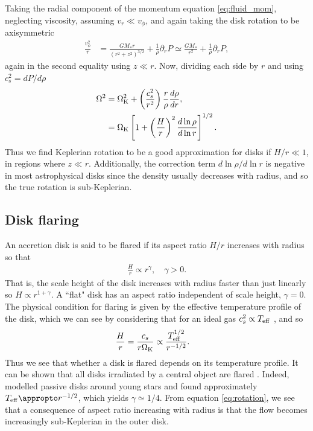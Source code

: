 Taking the radial component of the momentum equation \ref{eq:fluid_mom}, neglecting viscosity, assuming $v_r \ll v_\phi$, and again taking the disk rotation to be axisymmetric
\begin{align}
    \frac{v_\phi^2}{r} &= \frac{G M_* r}{\left( r^2 + z^2  \right)^{3/2}} + \frac{1}{\rho} \partial_r P \simeq \frac{G M_*}{ r^2} + \frac{1}{\rho} \partial_r P, 
\end{align}
again in the second equality using $z \ll r$. Now, dividing each side by $r$ and using $c_s^2=dP/d\rho$
\begin{align}
    \Omega^2 &= \Omega_{\rm K}^2 + \left( \frac{c_s^2}{r^2} \right) \frac{r}{\rho} \frac{d \rho}{dr}, \\
    &= \Omega_{\rm K} \left[ 1 + \left(\frac{H}{r}\right)^2 \frac{d \ln{\rho}}{d \ln{r}} \right]^{1/2} . \label{eq:rotation}
\end{align}
Thus we find Keplerian rotation to be a good approximation for disks if $H/r \ll 1$, in regions where $z \ll r$. Additionally, the correction term $d\ln{\rho}/d\ln{r}$ is negative in most astrophysical disks since the density usually decreases with radius, and so the true rotation is sub-Keplerian.

\subsection{Disk flaring}

An accretion disk is said to be flared if its aspect ratio $H/r$ increases with radius so that
\begin{align}
    \frac{H}{r} \propto r^\gamma, \quad \gamma > 0.
\end{align}
That is, the scale height of the disk increases with radius faster than just linearly so $H \propto r^{1+\gamma}$. 
A ``flat" disk has an aspect ratio independent of scale height, $\gamma=0$.
The physical condition for flaring is given by the effective temperature profile of the disk, which we can see by considering that for an ideal gas $c_s^2 \propto T_{\rm eff}$ \citep[eg.][]{pringle2007}, and so
\begin{align}
    \frac{H}{r} &= \frac{c_s}{r \Omega_{\rm K}} \propto \frac{T_{\rm eff}^{1/2}}{r^{-1/2}}.
\end{align}
Thus we see that whether a disk is flared depends on its temperature profile. 
It can be shown that all disks irradiated by a central object are flared \citep{kenyon1987}. 
Indeed, \citet{chiang1997} modelled passive disks around young stars and found approximately $T_{\rm eff} \appropto r^{-1/2}$, which yields $\gamma \simeq 1/4$. 
From equation \ref{eq:rotation}, we see that a consequence of aspect ratio increasing with radius is that the flow becomes increasingly sub-Keplerian in the outer disk.

